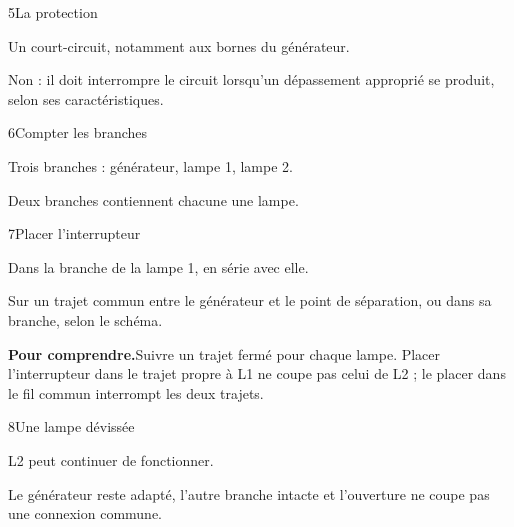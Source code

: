 \par\noindent\begin{minipage}{\linewidth}
\begin{corrige}{5}{La protection}
\begin{questions}
\item Un court-circuit, notamment aux bornes du générateur.
\item Non : il doit interrompre le circuit lorsqu’un dépassement approprié se produit, selon ses caractéristiques.
\end{questions}
\end{corrige}
\end{minipage}
\par\noindent\begin{minipage}{\linewidth}
\begin{corrige}{6}{Compter les branches}
\begin{questions}
\item Trois branches : générateur, lampe 1, lampe 2.
\item Deux branches contiennent chacune une lampe.
\end{questions}
\end{corrige}
\end{minipage}
\par\noindent\begin{minipage}{\linewidth}
\begin{corrige}{7}{Placer l’interrupteur}
\begin{questions}
\item Dans la branche de la lampe 1, en série avec elle.
\item Sur un trajet commun entre le générateur et le point de séparation, ou dans sa branche, selon le schéma.
\end{questions}
\par\smallskip\noindent\textbf{Pour comprendre.}\enspace Suivre un trajet fermé pour chaque lampe. Placer l’interrupteur dans le trajet propre à L1 ne coupe pas celui de L2 ; le placer dans le fil commun interrompt les deux trajets.\par
{}
\end{corrige}
\end{minipage}
\par\noindent\begin{minipage}{\linewidth}
\begin{corrige}{8}{Une lampe dévissée}
\begin{questions}
\item L2 peut continuer de fonctionner.
\item Le générateur reste adapté, l’autre branche intacte et l’ouverture ne coupe pas une connexion commune.
\end{questions}
\end{corrige}
\end{minipage}
